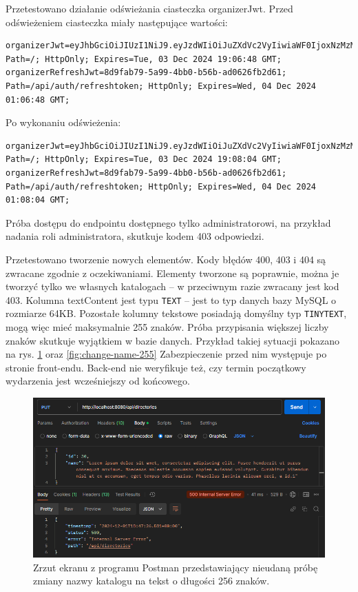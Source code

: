 \documentclass[a4paper,twoside,12pt]{book}
\begin{document}
Przetestowano działanie odświeżania ciasteczka organizerJwt. Przed odświeżeniem ciasteczka miały następujące wartości:
\begin{verbatim}
organizerJwt=eyJhbGciOiJIUzI1NiJ9.eyJzdWIiOiJuZXdVc2VyIiwiaWF0IjoxNzMzMTY2NDA4LCJleHAiOjE3MzMyNTI4MDh9._JyoQNrhYdpdl3EPM8NFg29c0HwLm5nMidQ8Fh4Wsik; Path=/; HttpOnly; Expires=Tue, 03 Dec 2024 19:06:48 GMT;
organizerRefreshJwt=8d9fab79-5a99-4bb0-b56b-ad0626fb2d61; Path=/api/auth/refreshtoken; HttpOnly; Expires=Wed, 04 Dec 2024 01:06:48 GMT;
\end{verbatim}
Po wykonaniu odświeżenia:
\begin{verbatim}
organizerJwt=eyJhbGciOiJIUzI1NiJ9.eyJzdWIiOiJuZXdVc2VyIiwiaWF0IjoxNzMzMTY2NDg0LCJleHAiOjE3MzMyNTI4ODR9.ekR8DYMFlny3pKLKaunjOtXXTE3qH8dTfEFGYdaSpNs; Path=/; HttpOnly; Expires=Tue, 03 Dec 2024 19:08:04 GMT;
organizerRefreshJwt=8d9fab79-5a99-4bb0-b56b-ad0626fb2d61; Path=/api/auth/refreshtoken; HttpOnly; Expires=Wed, 04 Dec 2024 01:08:04 GMT;
\end{verbatim}

Próba dostępu do endpointu dostępnego tylko administratorowi, na przykład nadania roli administratora, skutkuje kodem 403 odpowiedzi.

Przetestowano tworzenie nowych elementów. Kody błędów 400, 403 i 404 są zwracane zgodnie z oczekiwaniami. Elementy tworzone są poprawnie, można je tworzyć tylko we własnych katalogach -- w przeciwnym razie zwracany jest kod 403. Kolumna textContent jest typu \texttt{TEXT} -- jest to typ danych bazy MySQL o rozmiarze 64KB. Pozostałe kolumny tekstowe posiadają domyślny typ \texttt{TINYTEXT}, mogą więc mieć maksymalnie 255 znaków. Próba przypisania większej liczby znaków skutkuje wyjątkiem w bazie danych. Przykład takiej sytuacji pokazano na rys. \ref{fig:change-name-256} oraz \ref{fig:change-name-255} Zabezpieczenie przed nim występuje po stronie front-endu. Back-end nie weryfikuje też, czy termin początkowy wydarzenia jest wcześniejszy od końcowego.

\begin{figure}
\centering
\includegraphics[width=\textwidth]{./ChangeName256.png}
\caption{Zrzut ekranu z programu Postman przedstawiający nieudaną próbę zmiany nazwy katalogu na tekst o długości 256 znaków.}
\label{fig:change-name-256}
\end{figure}
\end{document}

